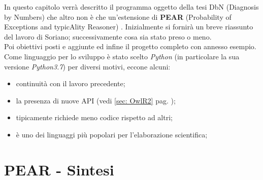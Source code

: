 In questo capitolo verrà descritto il programma oggetto della tesi DbN (Diagnosis by Numbers) che altro 
non è che un'estensione di \textbf{PEAR} (Probability of Exceptions and typicAlity Reasoner) \cite{PEAR}.
Inizialmente si fornirà un breve riassunto del lavoro di Soriano; successivamente cosa sia stato preso o meno.\\
Poi obiettivi posti e aggiunte ed infine il progetto completo con annesso esempio.
Come linguaggio per lo sviluppo è stato scelto \emph{Python} (in particolare la sua
versione \textit{Python3.7}) per diversi motivi, eccone alcuni:
\begin{itemize}
	\item continuità con il lavoro precedente;
	\item la presenza di nuove API (vedi \ref{sec: OwlR2} pag. \pageref{sec: OwlR2});
	\item tipicamente richiede meno codice rispetto ad altri;
	\item è uno dei linguaggi più popolari per l'elaborazione scientifica;
\end{itemize}

\section{PEAR - Sintesi}
